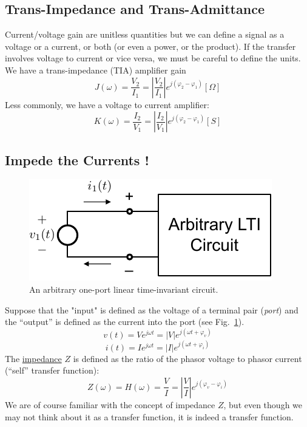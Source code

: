 \subsection{Trans-Impedance and Trans-Admittance}
Current/voltage gain are unitless quantities but we can define a signal as a voltage or a current, or both (or even a power, or the product).   If the transfer involves voltage to current or vice versa, we must be careful to define the units.  We have a trans-impedance (TIA) amplifier gain
    \begin{equation}
        J(\omega ) = \frac{{{V_2}}}{{{I_1}}} = \left| {\frac{{{V_2}}}{{{I_1}}}} \right|{e^{j({\varphi _2} - {\varphi _1})}}  [\Omega ]
    \end{equation}
Less commonly, we have a voltage to current amplifier:
    \begin{equation}
        K(\omega ) = \frac{{{I_2}}}{{{V_1}}} = \left| {\frac{{{I_2}}}{{{V_1}}}} \right|{e^{j({\varphi _2} - {\varphi _1})}}  [S]
    \end{equation}
\subsection{Impede the Currents !}
\begin{figure}[tb]
\centering
\includegraphics[width=.5\columnwidth]{mod1_3_2_oneport}
\caption{An arbitrary one-port linear time-invariant circuit.}
\label{fig:oneport}
\end{figure}
Suppose that the "input" is defined as the voltage of a terminal pair (\textit{port}) and the “output” is defined as the current into the port (see Fig.~\ref{fig:oneport}).  
    \begin{equation}
        v(t) = V{e^{j\omega t}} = \left| V \right|{e^{j(\omega t + {\varphi _v})}}
    \end{equation}
    \begin{equation}
        i(t) = I{e^{j\omega t}} = \left| I \right|{e^{j(\omega t + {\varphi _i})}}
    \end{equation}
The \underline{impedance} $Z$  is defined as the ratio of the phasor voltage to phasor current (“self” transfer function):
    \begin{equation}
        Z(\omega ) = H(\omega ) = \frac{V}{I} = \left| {\frac{V}{I}} \right|{e^{j({\varphi _v} - {\varphi _i})}}
    \end{equation}
We are of course familiar with the concept of impedance $Z$, but even though we may not think about it as a transfer function, it is indeed a transfer function.
